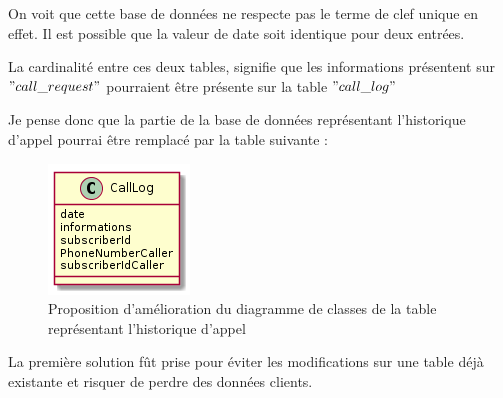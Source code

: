 On voit que cette base de données ne respecte pas le terme de clef unique en effet. Il est possible que la valeur de date soit identique pour deux entrées.

La cardinalité entre ces deux tables, signifie que les informations présentent sur $"call\_request"$ pourraient être présente sur la table $"call\_log"$

Je pense donc que la partie de la base de données représentant l'historique d'appel pourrai être remplacé par la table suivante :

\begin{figure}[!h]
	\centering
	\includegraphics[scale=1]{img/classeCallLogNew.png}
	\caption{\label{class_callLog_new} Proposition d'amélioration du diagramme de classes de la table représentant l'historique d'appel}
\end{figure}

La première solution fût prise pour éviter les modifications sur une table déjà existante et risquer de perdre des données clients. 